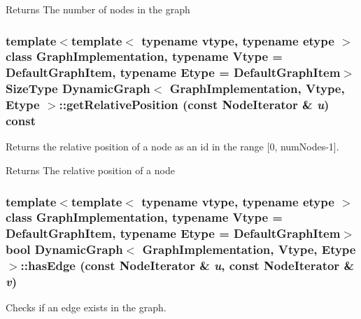 \begin{DoxyReturn}{Returns}
The number of nodes in the graph 
\end{DoxyReturn}
\hypertarget{class_dynamic_graph_ad1e501790b0784cd925f766ca4ab6e0c}{
\subsubsection[{getRelativePosition}]{\setlength{\rightskip}{0pt plus 5cm}template$<$template$<$ typename vtype, typename etype $>$ class GraphImplementation, typename Vtype  = DefaultGraphItem, typename Etype  = DefaultGraphItem$>$ SizeType {\bf DynamicGraph}$<$ GraphImplementation, Vtype, Etype $>$::getRelativePosition (const NodeIterator \& {\em u}) const}}
\label{class_dynamic_graph_ad1e501790b0784cd925f766ca4ab6e0c}


Returns the relative position of a node as an id in the range \mbox{[}0, numNodes-\/1\mbox{]}. 

\begin{DoxyReturn}{Returns}
The relative position of a node 
\end{DoxyReturn}
\hypertarget{class_dynamic_graph_a67dcf2352cfd2eb25141301f4362e88f}{
\subsubsection[{hasEdge}]{\setlength{\rightskip}{0pt plus 5cm}template$<$template$<$ typename vtype, typename etype $>$ class GraphImplementation, typename Vtype  = DefaultGraphItem, typename Etype  = DefaultGraphItem$>$ bool {\bf DynamicGraph}$<$ GraphImplementation, Vtype, Etype $>$::hasEdge (const NodeIterator \& {\em u}, \/  const NodeIterator \& {\em v})}}
\label{class_dynamic_graph_a67dcf2352cfd2eb25141301f4362e88f}


Checks if an edge exists in the graph. 


